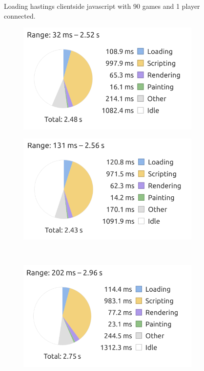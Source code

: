 \begin{figure}[h!]
    \caption{Loading hastings clientside javascript with 90 games and 1 player connected.}
    \label{fig:my_label}
\end{figure}

\begin{figure}[h!]
    \centering
    \begin{subfigure}{0.49\textwidth}
        \includegraphics[width=\textwidth]{figure/clientsidePerformance/braseegraph1.png}
    \end{subfigure}
    \begin{subfigure}{0.49\textwidth}
        \includegraphics[width=\textwidth]{figure/clientsidePerformance/braseegraph2.png}
    \end{subfigure}
    \\
    \begin{subfigure}{0.5\textwidth}
        \includegraphics[width=\textwidth]{figure/clientsidePerformance/braseegraph3.png}
    \end{subfigure}
    

\end{figure}
